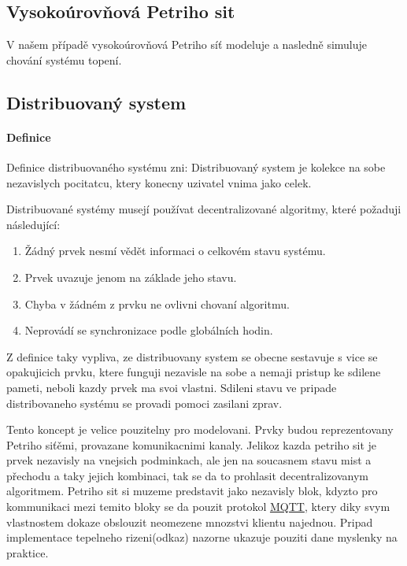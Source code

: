 \subsection{Vysokoúrovňová Petriho sit}

V našem případě vysokoúrovňová Petriho síť modeluje a nasledně simuluje chování systému topení.

\subsection{Distribuovaný system}
\label{subsec:distr_system}

\paragraph{Definice}

Definice distribuovaného systému zni:
Distribuovaný system je kolekce na sobe nezavislych pocitatcu, ktery konecny uzivatel vnima jako celek. 

Distribuované systémy musejí používat decentralizované algoritmy, které požaduji následující: 
\begin{enumerate}
  \item Žádný prvek nesmí vědět informaci o celkovém stavu systému.
  \item Prvek uvazuje jenom na základe jeho stavu.
  \item Chyba v žádném z prvku ne ovlivni chovaní algoritmu.
  \item Neprovádí se synchronizace podle globálních hodin.
\end{enumerate}

Z definice taky vypliva, ze distribuovany system se obecne sestavuje s vice se opakujicich prvku, ktere funguji nezavisle na sobe a nemaji pristup ke sdilene pameti, neboli kazdy prvek ma svoi vlastni. Sdileni stavu ve pripade distribovaneho systému se provadi pomoci zasilani zprav.

Tento koncept je velice pouzitelny pro modelovani. Prvky budou reprezentovany Petriho siťěmi, provazane komunikacnimi kanaly. Jelikoz kazda petriho sit je prvek nezavisly na vnejsich podminkach, ale jen na soucasnem stavu mist a přechodu a taky jejich kombinaci, tak se da to prohlasit decentralizovanym algoritmem. Petriho sit si muzeme predstavit jako nezavisly blok, kdyzto pro kommunikaci mezi temito bloky se da pouzit protokol \href{http://docs.oasis-open.org/mqtt/mqtt/v3.1.1/csprd02/mqtt-v3.1.1-csprd02.html}{MQTT}, ktery diky svym vlastnostem dokaze obslouzit neomezene mnozstvi klientu najednou. Pripad implementace tepelneho rizeni(odkaz) nazorne ukazuje pouziti dane myslenky na praktice.
